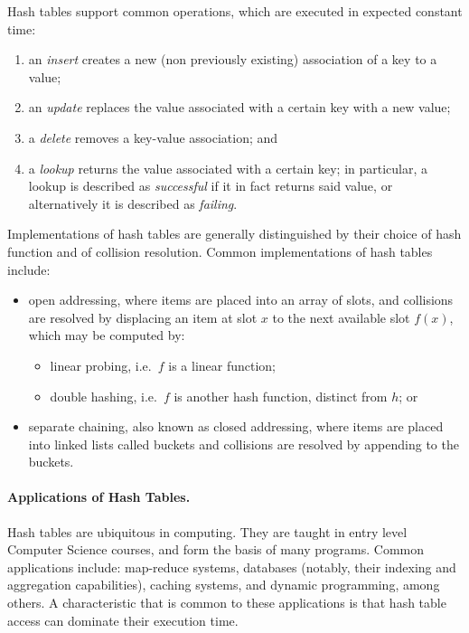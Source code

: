 Hash tables support common operations, which are executed in expected constant time:
\begin{enumerate}
    \item an \emph{insert} creates a new (non previously existing) association of a key to a value;
    \item an \emph{update} replaces the value associated with a certain key with a new value;
    \item a \emph{delete} removes a key-value association; and
    \item a \emph{lookup} returns the value associated with a certain key; in particular, a lookup is described as \emph{successful} if it in fact returns said value, or alternatively it is described as \emph{failing}.
\end{enumerate}

Implementations of hash tables are generally distinguished by their choice of hash function and of collision resolution.
Common implementations of hash tables include:
\begin{itemize}
    \item open addressing, where items are placed into an array of slots, and collisions are resolved by displacing an item at slot $x$ to the next available slot $f(x)$, which may be computed by:
    \begin{itemize}
        \item linear probing, i.e.\ $f$ is a linear function;
        \item double hashing, i.e.\ $f$ is another hash function, distinct from $h$; or
    \end{itemize}
    \item separate chaining, also known as closed addressing, where items are placed into linked lists called buckets and collisions are resolved by appending to the buckets.
\end{itemize}

\paragraph{Applications of Hash Tables.}\label{par:applications-of-hash-tables}

Hash tables are ubiquitous in computing.
They are taught in entry level Computer Science courses, and form the basis of many programs.
Common applications include: map-reduce systems, databases (notably, their indexing and aggregation capabilities), caching systems, and dynamic programming, among others.
A characteristic that is common to these applications is that hash table access can dominate their execution time.

